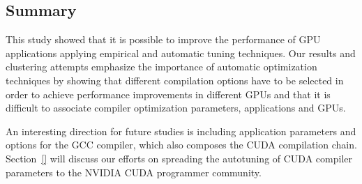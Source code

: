 \subsection{Summary}
\label{subsec:GPUconcl}

This study showed that it is possible to improve the performance of GPU
applications applying empirical and automatic tuning techniques. Our results
and clustering attempts emphasize the importance of automatic optimization
techniques by showing that different compilation options have to be selected in
order to achieve performance improvements in different GPUs and that it is
difficult to associate compiler optimization parameters, applications and GPUs.

An interesting direction for future studies is including application parameters
and options for the GCC compiler, which also composes the CUDA compilation
chain. Section~\ref{} will discuss our efforts on spreading the autotuning
of CUDA compiler parameters to the NVIDIA CUDA programmer community.

